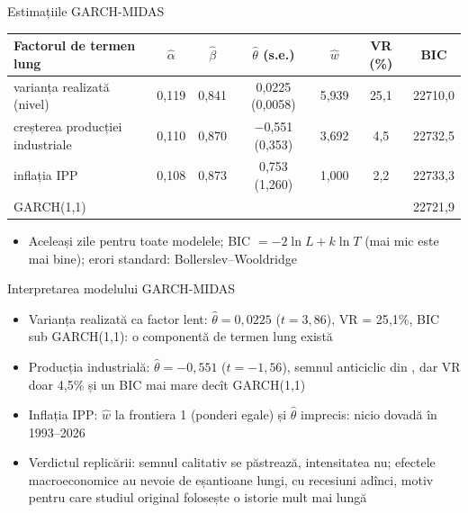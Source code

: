 \begin{frame}{Estimațiile GARCH-MIDAS}
\itemsize{\small}
\begin{center}
\scriptsize
\begin{tabular}{lcccccc}
\toprule
\textbf{Factorul de termen lung} & $\hat\alpha$ & $\hat\beta$ & $\hat\theta$ (s.e.) & $\hat w$ & VR (\%) & BIC \\
\midrule
varianța realizată (nivel) & 0{,}119 & 0{,}841 & 0{,}0225 (0{,}0058) & 5{,}939 & 25{,}1 & 22710{,}0 \\
creșterea producției industriale & 0{,}110 & 0{,}870 & \ensuremath{-}0{,}551 (0{,}353) & 3{,}692 & 4{,}5 & 22732{,}5 \\
inflația IPP & 0{,}108 & 0{,}873 & 0{,}753 (1{,}260) & 1{,}000 & 2{,}2 & 22733{,}3 \\
GARCH(1,1) & & & & & & 22721{,}9 \\
\bottomrule
\end{tabular}
\end{center}
\begin{itemize}
    \item Aceleași zile pentru toate modelele; BIC $= -2\ln L + k\ln T$ (mai mic este mai bine); erori standard: Bollerslev--Wooldridge
\end{itemize}
\end{frame}

\begin{frame}{Interpretarea modelului GARCH-MIDAS}
\itemsize{\small}
\begin{itemize}
    \item Varianța realizată ca factor lent: $\hat\theta = 0{,}0225$ ($t = 3{,}86$), VR = 25{,}1\%, BIC sub GARCH(1,1): o componentă de termen lung există
    \item Producția industrială: $\hat\theta = \ensuremath{-}0{,}551$ ($t = \ensuremath{-}1{,}56$), semnul anticiclic din , dar VR doar 4{,}5\% și un BIC mai mare decît GARCH(1,1)
    \item Inflația IPP: $\hat w$ la frontiera 1 (ponderi egale) și $\hat\theta$ imprecis: nicio dovadă în 1993--2026
    \item Verdictul replicării: semnul calitativ se păstrează, intensitatea nu; efectele macroeconomice au nevoie de eșantioane lungi, cu recesiuni adînci, motiv pentru care studiul original folosește o istorie mult mai lungă
\end{itemize}
\end{frame}


